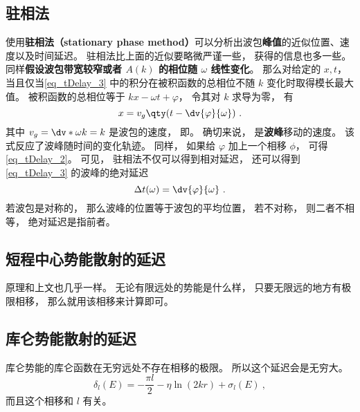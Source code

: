 \subsection{驻相法}
使用\textbf{驻相法（stationary phase method）}可以分析出波包\textbf{峰值}的近似位置、速度以及时间延迟。 驻相法比上面的近似要略微严谨一些， 获得的信息也多一些。 同样\textbf{假设波包带宽较窄或者 $A(k)$ 的相位随 $\omega$ 线性变化}。 那么对给定的 $x, t$， 当且仅当\autoref{eq_tDelay_3} 中的积分在被积函数的总相位不随 $k$ 变化时取得模长最大值。 被积函数的总相位等于 $kx - \omega t + \varphi$， 令其对 $k$ 求导为零， 有
\begin{equation}\label{eq_tDelay_5}
x = v_g \qty(t - \dv{\varphi}{\omega})~.
\end{equation}
其中 $v_g = \dv*{\omega}{k} = k$ 是波包的速度， 即。 确切来说， 是\textbf{波峰}移动的速度。 该式反应了波峰随时间的变化轨迹。 同样， 如果给 $\varphi$ 加上一个相移 $\phi$， 可得\autoref{eq_tDelay_2}。 可见， 驻相法不仅可以得到相对延迟， 还可以得到\autoref{eq_tDelay_3} 的波峰的绝对延迟
\begin{equation}\label{eq_tDelay_4}
\Delta t(\omega) = \dv{\varphi}{\omega}~.
\end{equation}
若波包是对称的， 那么波峰的位置等于波包的平均位置， 若不对称， 则二者不相等， 绝对延迟是指前者。

\subsection{短程中心势能散射的延迟}

原理和上文也几乎一样。 无论有限远处的势能是什么样， 只要无限远的地方有极限相移， 那么就用该相移来计算即可。

\subsection{库仑势能散射的延迟}
库仑势能的库仑函数在无穷远处不存在相移的极限。 所以这个延迟会是无穷大。
\begin{equation}
\delta_l(E) =  - \frac{\pi l}{2} - \eta\ln(2kr) + \sigma_l(E)~,
\end{equation}
而且这个相移和 $l$ 有关。
